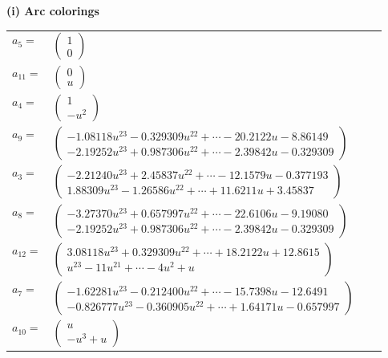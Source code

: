 \documentclass[1p]{elsarticle_modified}
\theoremstyle{definition}
\begin{document}
\flushleft \textbf{(i) Arc colorings}\\
\begin{tabular}{m{7pt} m{180pt} m{7pt} m{180pt} }
\flushright $a_{5}=$&$\begin{pmatrix}1\\0\end{pmatrix}$ \\
\flushright $a_{11}=$&$\begin{pmatrix}0\\u\end{pmatrix}$ \\
\flushright $a_{4}=$&$\begin{pmatrix}1\\- u^2\end{pmatrix}$ \\
\flushright $a_{9}=$&$\begin{pmatrix}-1.08118 u^{23}-0.329309 u^{22}+\cdots-20.2122 u-8.86149\\-2.19252 u^{23}+0.987306 u^{22}+\cdots-2.39842 u-0.329309\end{pmatrix}$ \\
\flushright $a_{3}=$&$\begin{pmatrix}-2.21240 u^{23}+2.45837 u^{22}+\cdots-12.1579 u-0.377193\\1.88309 u^{23}-1.26586 u^{22}+\cdots+11.6211 u+3.45837\end{pmatrix}$ \\
\flushright $a_{8}=$&$\begin{pmatrix}-3.27370 u^{23}+0.657997 u^{22}+\cdots-22.6106 u-9.19080\\-2.19252 u^{23}+0.987306 u^{22}+\cdots-2.39842 u-0.329309\end{pmatrix}$ \\
\flushright $a_{12}=$&$\begin{pmatrix}3.08118 u^{23}+0.329309 u^{22}+\cdots+18.2122 u+12.8615\\u^{23}-11 u^{21}+\cdots-4 u^2+u\end{pmatrix}$ \\
\flushright $a_{7}=$&$\begin{pmatrix}-1.62281 u^{23}-0.212400 u^{22}+\cdots-15.7398 u-12.6491\\-0.826777 u^{23}-0.360905 u^{22}+\cdots+1.64171 u-0.657997\end{pmatrix}$ \\
\flushright $a_{10}=$&$\begin{pmatrix}u\\- u^3+u\end{pmatrix}$ \\

\end{tabular}
\end{document}
